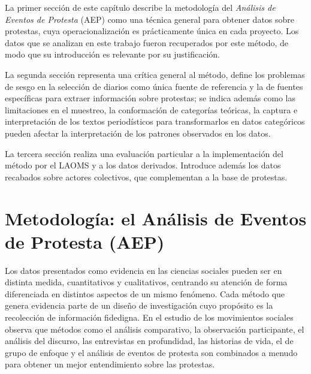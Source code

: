 \documentclass[letterpaper, 11pt]{book}
\theoremstyle{definition}
\theoremstyle{remark}
\begin{document}
La primer sección de este capítulo describe la metodología del \emph{Análisis de Eventos de Protesta} (AEP) como una técnica general para obtener datos sobre protestas, cuya operacionalización es prácticamente única en cada proyecto. Los datos que se analizan en este trabajo fueron recuperados por este método, de modo que su introducción es relevante por su justificación.

La segunda sección representa una crítica general al método, define los problemas de sesgo en la selección de diarios como única fuente de referencia y la de fuentes específicas para extraer información sobre protestas; se indica además como las limitaciones en el muestreo, la conformación de categorías teóricas, la captura e interpretación de los textos periodísticos para transformarlos en datos categóricos pueden afectar la interpretación de los patrones observados en los datos.

La tercera sección realiza una evaluación particular a la implementación del método por el LAOMS y a los datos derivados. Introduce además los datos recabados sobre actores colectivos, que complementan a la base de protestas.



\section{Metodología: el Análisis de Eventos de Protesta (AEP)}
\label{sec:AEP}

Los datos presentados como evidencia en las ciencias sociales pueden ser en distinta medida, cuantitativos y cualitativos, centrando su atención de forma diferenciada en distintos aspectos de un mismo fenómeno. 
Cada método que genera evidencia parte de un diseño de investigación cuyo propósito es la recolección de información fidedigna. 
En el estudio de los movimientos sociales \citet{2014_DellaPorta_Metodologicalpluralism} observa que métodos como el análisis comparativo, la observación participante, el análisis del discurso, las entrevistas en profundidad, las historias de vida, el de grupo de enfoque y el análisis de eventos de protesta son combinados a menudo para obtener un mejor entendimiento sobre las protestas.
\end{document}
